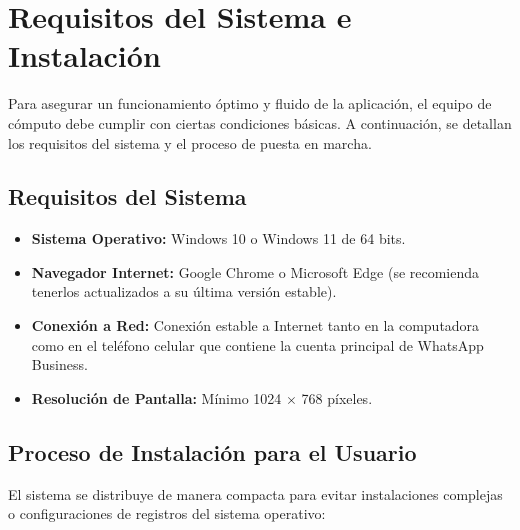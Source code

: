 \documentclass[11pt,a4paper]{article}
\begin{document}
\newpage

\section{Requisitos del Sistema e Instalación}

Para asegurar un funcionamiento óptimo y fluido de la aplicación, el equipo de cómputo debe cumplir con ciertas condiciones básicas. A continuación, se detallan los requisitos del sistema y el proceso de puesta en marcha.

\subsection{Requisitos del Sistema}
\begin{itemize}
    \item \textbf{Sistema Operativo:} Windows 10 o Windows 11 de 64 bits.
    \item \textbf{Navegador Internet:} Google Chrome o Microsoft Edge (se recomienda tenerlos actualizados a su última versión estable).
    \item \textbf{Conexión a Red:} Conexión estable a Internet tanto en la computadora como en el teléfono celular que contiene la cuenta principal de WhatsApp Business.
    \item \textbf{Resolución de Pantalla:} Mínimo 1024 $\times$ 768 píxeles.
\end{itemize}

\subsection{Proceso de Instalación para el Usuario}
El sistema se distribuye de manera compacta para evitar instalaciones complejas o configuraciones de registros del sistema operativo:
\end{document}
